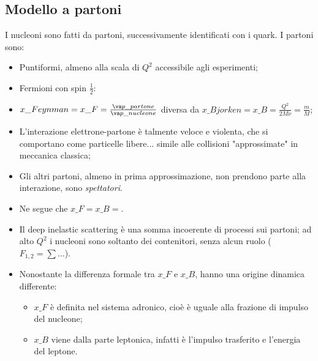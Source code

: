 \subsection{Modello a partoni}
I nucleoni sono fatti da partoni, successivamente identificati con i quark. I partoni sono:
    \begin{itemize}
        \item Puntiformi, almeno alla scala di $Q^2$ accessibile agli esperimenti;
        \item Fermioni con spin $\frac{1}{2}$:
        \item $x\_{Feynman}=x\_F=\frac{\va p\_{partone}}{\va p\_{nucleone}}$ diversa da $x\_{Bjorken}=x\_B=\frac{Q^2}{2M\nu}=\frac{m}{M}$;
        \item L'interazione elettrone-partone è talmente veloce e violenta, che si comportano come particelle libere... simile alle collisioni "approssimate" in meccanica classica;
        \item Gli altri partoni, almeno in prima approssimazione, non prendono parte alla interazione, sono \textit{spettatori}.
        \item Ne segue che $x\_F=x\_B=$.
        \item Il deep inelastic scattering è una somma incoerente di processi sui partoni; ad alto $Q^2$ i nucleoni sono soltanto dei contenitori, senza alcun ruolo ($F_{1,2}=\sum\dots$).
        \item Nonostante la differenza formale tra $x\_F$ e $x\_B$, hanno una origine dinamica differente:
        \begin{itemize}
            \item $x\_F$ è definita nel sistema adronico, cioè è uguale alla frazione di impulso del nucleone;
            \item $x\_B$ viene dalla parte leptonica, infatti è l'impulso trasferito e l'energia del leptone. 
        \end{itemize}
    \end{itemize} 
